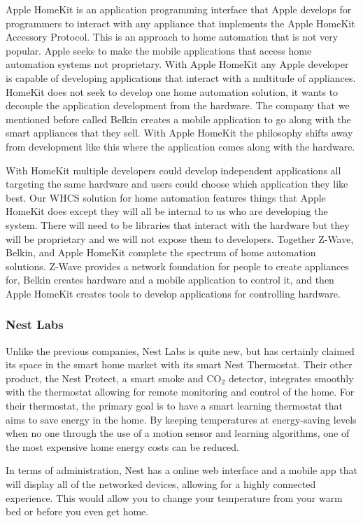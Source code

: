Apple HomeKit is an application programming interface that Apple develops for
programmers to interact with any appliance that implements the Apple HomeKit
Accessory Protocol. This is an approach to home automation that is not very
popular.  Apple seeks to make the mobile applications that access home
automation systems not proprietary. With Apple HomeKit any Apple developer is
capable of developing applications that interact with a multitude of
appliances. HomeKit does not seek to develop one home automation solution, it
wants to decouple the application development from the hardware. The company
that we mentioned before called Belkin creates a mobile application to go along
with the smart appliances that they sell. With Apple HomeKit the philosophy
shifts away from development like this where the application comes along with
the hardware.

With HomeKit multiple developers could develop independent applications all
targeting the same hardware and users could choose which application they like
best. Our WHCS solution for home automation features things that Apple
HomeKit does except they will all be internal to us who are developing the
system. There will need to be libraries that interact with the hardware but
they will be proprietary and we will not expose them to developers. Together
Z{}-Wave, Belkin, and Apple HomeKit complete the spectrum of home automation
solutions. Z{}-Wave provides a network foundation for people to create
appliances for, Belkin creates hardware and a mobile application to control it,
and then Apple HomeKit creates tools to develop applications for controlling
hardware.


\subsubsection{Nest Labs}
Unlike the previous companies, Nest Labs\cite{link19} is quite new,
but has certainly claimed its space in the smart home market with its smart
Nest Thermostat. Their other product, the Nest Protect, a smart smoke and
CO$_2$ detector, integrates smoothly with the thermostat allowing for remote
monitoring and control of the home. For their thermostat, the primary goal is
to have a smart learning thermostat that aims to save energy in the home. By
keeping temperatures at energy-saving levels when no one through the use of a
motion sensor and learning algorithms, one of the most expensive home energy
costs can be reduced.

In terms of administration, Nest has a online web interface and a mobile app
that will display all of the networked devices, allowing for a highly connected
experience. This would allow you to change your temperature from your warm bed
or before you even get home.

